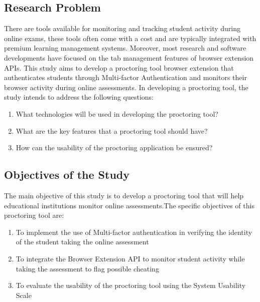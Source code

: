 \documentclass{icsthesis}
\begin{document}
\begin{mainmatter}
\subsection{Research Problem}
There are tools available for monitoring and tracking student activity during online exams, these tools often come with a cost and are typically integrated with premium learning management systems. Moreover, most research and software developments have focused on the tab management features of browser extension APIs. This study aims to develop a proctoring tool browser extension that authenticates students through Multi-factor Authentication and monitors their browser activity during online assessments. In developing a proctoring tool, the study intends to address the following questions:

\begin{enumerate}
    \item What technologies will be used in developing the proctoring tool?
    \item What are the key features that a proctoring tool should have? 
    \item How can the usability of the proctoring application be ensured?
\end{enumerate}



\subsection{Objectives of the Study}
The main objective of this study is to develop a proctoring tool that will help educational institutions monitor online assessments.The specific objectives of this proctoring tool are:
\begin{enumerate}
    \item To implement the use of Multi-factor authentication in verifying the identity of the student taking the online assessment
    \item To integrate the Browser Extension API to monitor student activity while taking the assessment  to flag possible cheating
    \item To evaluate the usability of the proctoring tool using the System Usability Scale
\end{enumerate}

 

\end{mainmatter}
\end{document}
